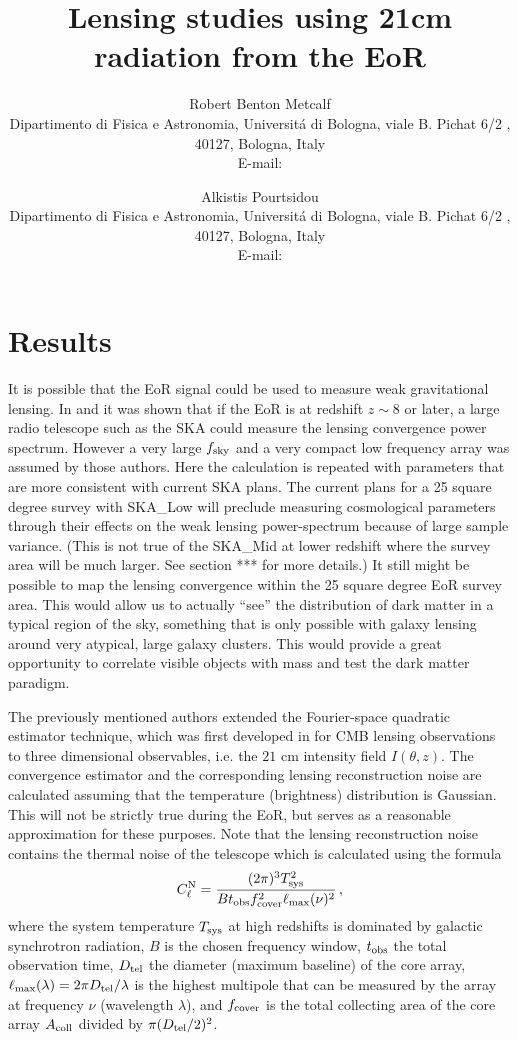 \documentclass{PoS}
\title{Lensing studies using 21cm radiation from the EoR}
\author{Robert Benton Metcalf\\
        Dipartimento di Fisica e Astronomia, Universit\'{a} di Bologna, viale B. Pichat 6/2 , 40127, Bologna, Italy\\
        E-mail: \email{robertbenton.metcalf@unibo.it}}
\author{Alkistis Pourtsidou\\
        Dipartimento di Fisica e Astronomia, Universit\'{a} di Bologna, viale B. Pichat 6/2 , 40127, Bologna, Italy\\
        E-mail: \email{alkistis.pourtsidou@unibo.it}}
\begin{document}
\section{Results}

It is possible that the EoR signal could be used to measure weak gravitational lensing.
In \cite{Zahn:2005ap} and \cite{Metcalf:2009}  it was shown that if the EoR is at redshift 
$z \sim 8$ or later, a large radio telescope such as the SKA could measure the lensing convergence power spectrum.  However a very large $f_{\rm sky}$ and a very compact low frequency array was assumed by those authors.  Here the calculation is repeated with parameters that are more consistent with current SKA plans.  The current plans for a 25 square degree survey with SKA\_Low will preclude measuring cosmological parameters through their effects on the weak lensing power-spectrum because of large sample variance.  (This is not true of the SKA\_Mid at lower redshift where the survey area will be much larger. See section *** for more details.)  It still might be possible to map the lensing convergence within the 25 square degree EoR survey area.  This would allow us to actually ``see'' the distribution of dark matter in a typical region of the sky, something that is only possible with galaxy lensing around very atypical, large galaxy clusters.  This would provide a great opportunity to correlate visible objects with mass and test the dark matter paradigm.

The previously mentioned authors extended the
Fourier-space quadratic estimator technique, which was first developed in 
\cite{Hu:2001tn} for CMB lensing  observations to three dimensional
observables, i.e. the $21$ cm intensity field $I(\theta,z)$.  
The  convergence
estimator and the corresponding lensing reconstruction noise are
calculated assuming that the temperature (brightness) distribution is
Gaussian. This will not be strictly true during the EoR, but serves as a reasonable approximation for these purposes. Note that the lensing reconstruction noise contains the thermal noise of the telescope which is calculated using the formula
\begin{equation}
C^{\rm N}_\ell = \frac{(2\pi)^3 T^2_{\rm sys}}{B t_{\rm obs} f^2_{\rm cover} \ell_{\rm max}(\nu)^2} \, ,
\end{equation} where the system temperature $T_{\rm sys}$ at high redshifts
 is dominated by galactic synchrotron radiation, $B$ is the chosen frequency window, $t_{\rm obs}$ the total observation time, $D_{\rm tel}$ the diameter (maximum baseline) of the core array, $\ell_{\rm max}(\lambda)=2\pi D_{\rm tel}/\lambda$ is the highest multipole that can be measured by the array at frequency $\nu$ (wavelength $\lambda$), and $f_{\rm cover}$ is the total collecting area of the core array $A_{\rm coll}$ divided by $\pi(D_{\rm tel}/2)^2$. 
 
\end{document}

